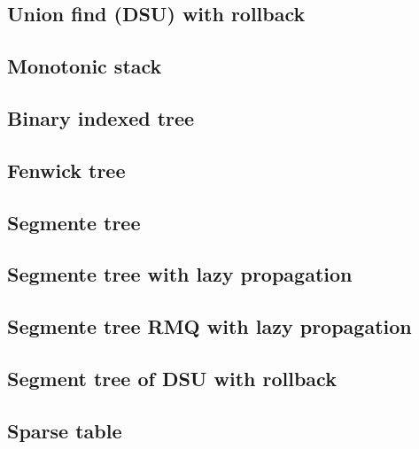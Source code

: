 \subsection{Union find (DSU) with rollback}
\raggedbottom
\hrulefill
\subsection{Monotonic stack}
\raggedbottom
\hrulefill
\subsection{Binary indexed tree}
\raggedbottom
\hrulefill
\subsection{Fenwick tree}
\raggedbottom
\hrulefill
\subsection{Segmente tree}
\raggedbottom
\hrulefill
\subsection{Segmente tree with lazy propagation}
\raggedbottom
\hrulefill
\subsection{Segmente tree RMQ with lazy propagation}
\raggedbottom
\hrulefill
\subsection{Segment tree of DSU with rollback}
\raggedbottom
\hrulefill
\subsection{Sparse table}
\raggedbottom
\hrulefill
